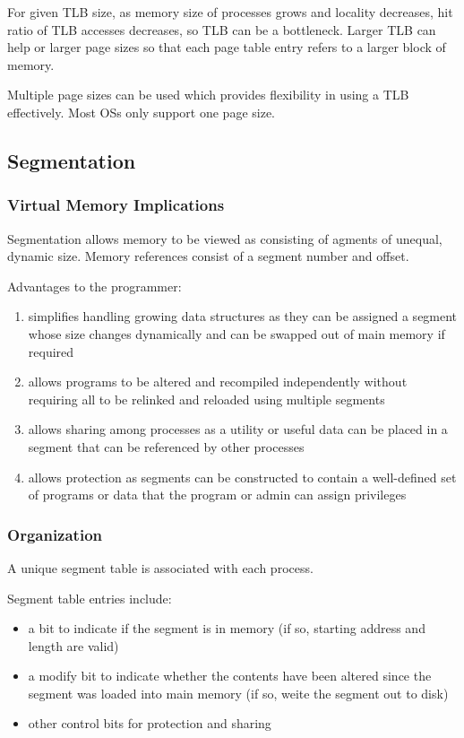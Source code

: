 \documentclass[11pt]{article}
\begin{document}
For given TLB size, as memory size of processes grows and locality decreases,
hit ratio of TLB accesses decreases, so TLB can be a bottleneck.
Larger TLB can help or larger page sizes so that each page table entry refers
to a larger block of memory.

Multiple page sizes can be used which provides flexibility in using a TLB effectively.
Most OSs only support one page size.
\subsection{Segmentation}
\label{sec:orgb2672ec}
\subsubsection{Virtual Memory Implications}
\label{sec:org80971b7}
Segmentation allows memory to be viewed as consisting of agments of unequal, dynamic size.
Memory references consist of a segment number and offset.

Advantages to the programmer:
\begin{enumerate}
\item simplifies handling growing data structures as they can be assigned a segment whose
size changes dynamically and can be swapped out of main memory if required
\item allows programs to be altered and recompiled independently without requiring all
to be relinked and reloaded using multiple segments
\item allows sharing among processes as a utility or useful data can be placed in a segment
that can be referenced by other processes
\item allows protection as segments can be constructed to contain a well-defined set of
programs or data that the program or admin can assign privileges
\end{enumerate}
\subsubsection{Organization}
\label{sec:org99513d1}
A unique segment table is associated with each process.

Segment table entries include:
\begin{itemize}
\item a bit to indicate if the segment is in memory (if so,
starting address and length are valid)
\item a modify bit to indicate whether the contents have been altered since the segment was
loaded into main memory (if so, weite the segment out to disk)
\item other control bits for protection and sharing
\end{itemize}
\end{document}
